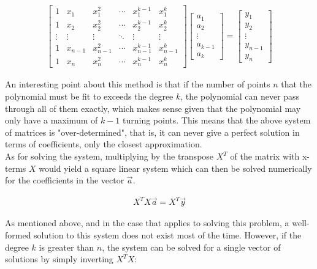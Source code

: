 \documentclass[12pt, a4paper]{article}
\begin{document}
\begin{align*}
    \begin{bmatrix}
        1      & x_1     & x_1^2     & \cdots & x_1^{k-1}     & x_1^k     \\
        1      & x_2     & x_2^2     & \cdots & x_2^{k-1}     & x_2^k     \\
        \vdots & \vdots  & \vdots    & \ddots & \vdots        & \vdots    \\
        1      & x_{n-1} & x_{n-1}^2 & \cdots & x_{n-1}^{k-1} & x_{n-1}^k \\
        1      & x_n     & x_n^2     & \cdots & x_n^{k-1}     & x_n^k
    \end{bmatrix}
    \begin{bmatrix}
        a_1 \\ a_2 \\ \vdots \\ a_{k-1} \\ a_k
    \end{bmatrix}
    =
    \begin{bmatrix}
        y_1 \\ y_2 \\ \vdots \\ y_{n-1} \\ y_n
    \end{bmatrix}
\end{align*}

An interesting point about this method is that if the number of points $n$ that
the polynomial must be fit to exceeds the degree $k$, the polynomial can never
pass through all of them exactly, which makes sense given that the polynomial
may only have a maximum of $k-1$ turning points. This means that the above
system of matrices is "over-determined", that is, it can never give a perfect
solution in terms of coefficients, only the closest approximation. \\

As for solving the system, multiplying by the transpose $X^T$ of the matrix with
x-terms $X$ would yield a square linear system which can then be solved
numerically for the coefficients in the vector $\vec{a}$.

\begin{align*}
    X^TX\vec{a}=X^T\vec{y}
\end{align*}

As mentioned above, and in the case that applies to solving this problem, a
well-formed solution to this system does not exist most of the time. However, if
the degree $k$ is greater than $n$, the system can be solved for a single vector
of solutions by simply inverting $X^TX$:
\end{document}

